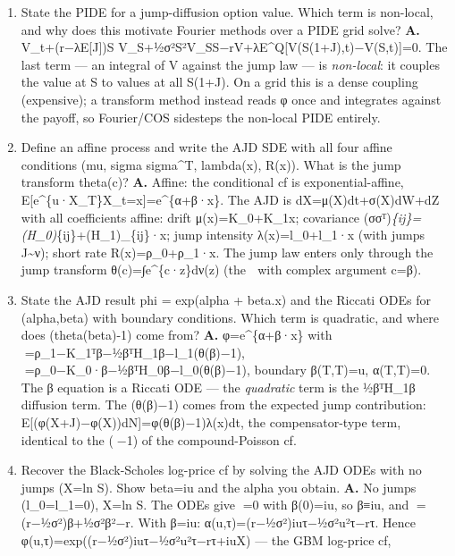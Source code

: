 \documentclass[
  11pt,
]{article}
\begin{document}
\begin{enumerate}
  too small) is too narrow, so the truncation-error floor stays high and
  the price is wrong \emph{no matter how many terms N} --- exactly the
  Assignment-2 bug. Keeping the √c\_4 term (whose pure-jump contribution
  fattens the tails) and a generous L widens {[}a,b{]} correctly.
\item
  State the PIDE for a jump-diffusion option value. Which term is
  non-local, and why does this motivate Fourier methods over a PIDE grid
  solve? \textbf{A.} V\_t+(r−λE{[}J{]})S
  V\_S+½σ²S²V\_SS−rV+λE\^{}Q{[}V(S(1+J),t)−V(S,t){]}=0. The last term
  --- an integral of V against the jump law --- is \emph{non-local}: it
  couples the value at S to values at all S(1+J). On a grid this is a
  dense coupling (expensive); a transform method instead reads φ once
  and integrates against the payoff, so Fourier/COS sidesteps the
  non-local PIDE entirely.
\item
  Define an affine process and write the AJD SDE with all four affine
  conditions (mu, sigma sigma\^{}T, lambda(x), R(x)). What is the jump
  transform theta(c)? \textbf{A.} Affine: the conditional cf is
  exponential-affine,
  E{[}e\^{}\{u·X\_T\}\textbar X\_t=x{]}=e\^{}\{α+β·x\}. The AJD is
  dX=μ(X)dt+σ(X)dW+dZ with all coefficients affine: drift
  μ(x)=K\_0+K\_1x; covariance
  (σσᵀ)\emph{\{ij\}=(H\_0)}\{ij\}+(H\_1)\_\{ij\}·x; jump intensity
  λ(x)=l\_0+l\_1·x (with jumps J\textasciitilde ν); short rate
  R(x)=ρ\_0+ρ\_1·x. The jump law enters only through the jump transform
  θ(c)=∫e\^{}\{c·z\}dν(z) (the  with complex argument c=β).
\item
  State the AJD result phi = exp(alpha + beta.x) and the Riccati ODEs
  for (alpha,beta) with boundary conditions. Which term is quadratic,
  and where does (theta(beta)-1) come from? \textbf{A.} φ=e\^{}\{α+β·x\}
  with =ρ\_1−K\_1ᵀβ−½βᵀH\_1β−l\_1(θ(β)−1),
  =ρ\_0−K\_0·β−½βᵀH\_0β−l\_0(θ(β)−1), boundary β(T,T)=u, α(T,T)=0. The
  β equation is a Riccati ODE --- the \emph{quadratic} term is the
  ½βᵀH\_1β diffusion term. The (θ(β)−1) comes from the expected jump
  contribution: E{[}(φ(X+J)−φ(X))dN{]}=φ(θ(β)−1)λ(x)dt, the
  compensator-type term, identical to the (−1) of the compound-Poisson
  cf.
\item
  Recover the Black-Scholes log-price cf by solving the AJD ODEs with no
  jumps (X=ln S). Show beta=iu and the alpha you obtain. \textbf{A.} No
  jumps (l\_0=l\_1=0), X=ln S. The ODEs give =0 with β(0)=iu, so β≡iu,
  and =(r−½σ²)β+½σ²β²−r. With β=iu: α(u,τ)=(r−½σ²)iuτ−½σ²u²τ−rτ. Hence
  φ(u,τ)=exp((r−½σ²)iuτ−½σ²u²τ−rτ+iuX) --- the GBM log-price cf,

\end{enumerate}
\end{document}
